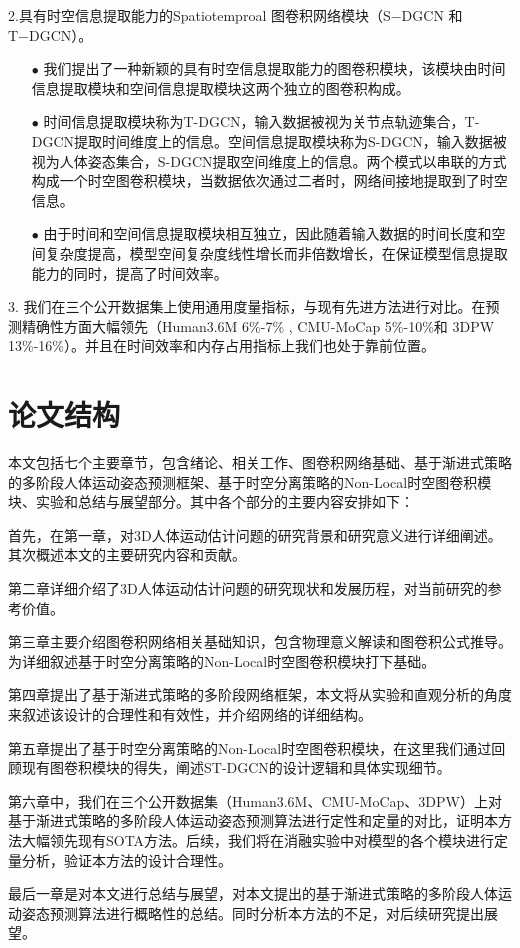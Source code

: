 2.具有时空信息提取能力的Spatiotemproal 图卷积网络模块（S−DGCN 和 T−DGCN）。
\begin{enumerate}[topsep = 0 pt, itemsep= 0 pt, parsep=0pt, partopsep=0pt, leftmargin=44pt, itemindent=0pt, labelsep=6pt]
	\item[$\bullet$] 我们提出了一种新颖的具有时空信息提取能力的图卷积模块，该模块由时间信息提取模块和空间信息提取模块这两个独立的图卷积构成。
	\item[$\bullet$] 时间信息提取模块称为T-DGCN，输入数据被视为关节点轨迹集合，T-DGCN提取时间维度上的信息。空间信息提取模块称为S-DGCN，输入数据被视为人体姿态集合，S-DGCN提取空间维度上的信息。两个模式以串联的方式构成一个时空图卷积模块，当数据依次通过二者时，网络间接地提取到了时空信息。
	\item[$\bullet$] 由于时间和空间信息提取模块相互独立，因此随着输入数据的时间长度和空间复杂度提高，模型空间复杂度线性增长而非倍数增长，在保证模型信息提取能力的同时，提高了时间效率。
\end{enumerate}

3. 我们在三个公开数据集上使用通用度量指标，与现有先进方法进行对比。在预测精确性方面大幅领先（Human3.6M 6\%-7\% , CMU-MoCap 5\%-10\%和 3DPW 13\%-16\%）。并且在时间效率和内存占用指标上我们也处于靠前位置。

\section{论文结构}
本文包括七个主要章节，包含绪论、相关工作、图卷积网络基础、基于渐进式策略的多阶段人体运动姿态预测框架、基于时空分离策略的Non-Local时空图卷积模块、实验和总结与展望部分。其中各个部分的主要内容安排如下：

首先，在第一章，对3D人体运动估计问题的研究背景和研究意义进行详细阐述。其次概述本文的主要研究内容和贡献。

第二章详细介绍了3D人体运动估计问题的研究现状和发展历程，对当前研究的参考价值。

第三章主要介绍图卷积网络相关基础知识，包含物理意义解读和图卷积公式推导。为详细叙述基于时空分离策略的Non-Local时空图卷积模块打下基础。

第四章提出了基于渐进式策略的多阶段网络框架，本文将从实验和直观分析的角度来叙述该设计的合理性和有效性，并介绍网络的详细结构。

第五章提出了基于时空分离策略的Non-Local时空图卷积模块，在这里我们通过回顾现有图卷积模块的得失，阐述ST-DGCN的设计逻辑和具体实现细节。

第六章中，我们在三个公开数据集（Human3.6M、CMU-MoCap、3DPW）上对基于渐进式策略的多阶段人体运动姿态预测算法进行定性和定量的对比，证明本方法大幅领先现有SOTA方法。后续，我们将在消融实验中对模型的各个模块进行定量分析，验证本方法的设计合理性。

最后一章是对本文进行总结与展望，对本文提出的基于渐进式策略的多阶段人体运动姿态预测算法进行概略性的总结。同时分析本方法的不足，对后续研究提出展望。



